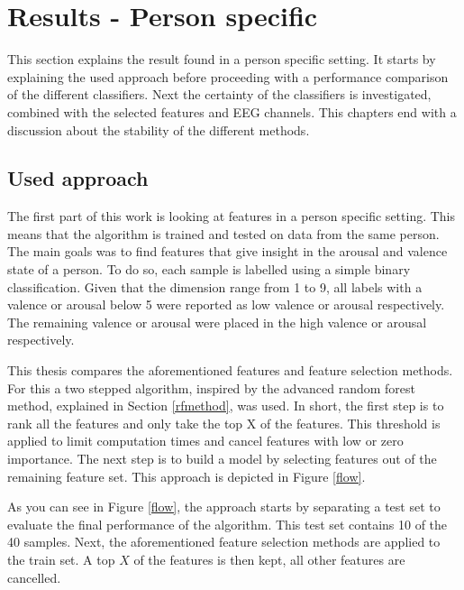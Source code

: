 \chapter{Results - Person specific}
{\samenvatting This section explains the result found in a person specific setting. It starts by explaining the used approach before proceeding with a performance comparison of the different classifiers. Next the certainty of the classifiers is investigated, combined with the selected features and EEG channels. This chapters end with a discussion about the stability of the different methods.}

\section{Used approach}
\label{approach}

The first part of this work is looking at features in a person specific setting. This means that the algorithm is trained and tested on data from the same person. The main goals was to find features that give insight in the arousal and valence state of a person. To do so, each sample is labelled using a simple binary classification. Given that the dimension range from 1 to 9, all labels with a valence or arousal below 5 were reported as low valence or arousal respectively. The remaining valence or arousal were placed in the high valence or arousal respectively.

\npar

This thesis compares the aforementioned features and feature selection methods. For this a two stepped algorithm, inspired by the advanced random forest method, explained in Section \ref{rfmethod}, was used. In short, the first step is to rank all the features and only take the top X of the features. This threshold is applied to limit computation times and cancel features with low or zero importance. The next step is to build a model by selecting features out of the remaining feature set. This approach is depicted in Figure \ref{flow}.


As you can see in Figure \ref{flow}, the approach starts by separating a test set to evaluate the final performance of the algorithm. This test set contains 10 of the 40 samples. Next, the aforementioned feature selection methods are applied to the train set. A top $X$ of the features is then kept, all other features are cancelled.


